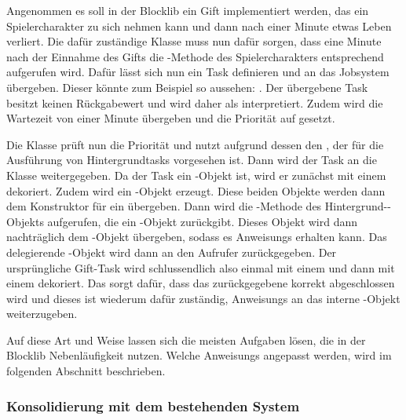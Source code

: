 \begin{example}
	Angenommen es soll in der Blocklib ein Gift implementiert werden, das ein Spielercharakter zu sich nehmen kann und dann nach einer Minute etwas Leben verliert. Die dafür zuständige Klasse muss nun dafür sorgen, dass eine Minute nach der Einnahme des Gifts die -Methode des Spielercharakters entsprechend aufgerufen wird. Dafür lässt sich nun ein Task definieren und an das Jobsystem übergeben. Dieser könnte zum Beispiel so aussehen: . Der übergebene Task besitzt keinen Rückgabewert und wird daher als \classRunnable{} interpretiert. Zudem wird die Wartezeit von einer Minute übergeben und die Priorität auf  gesetzt.

	Die Klasse \classBlocklibExecutor{} prüft nun die Priorität und nutzt aufgrund dessen den \classExecutorService{}, der für die Ausführung von Hintergrundtasks vorgesehen ist. Dann wird der Task an die Klasse \classCompletableFutureWrapper{} weitergegeben. Da der Task ein \classRunnable{}-Objekt ist, wird er zunächst mit einem \classRunnableCallable{} dekoriert. Zudem wird ein \classDelegatingScheduledCompletableFuture{}-Objekt erzeugt. Diese beiden Objekte werden dann dem Konstruktor für ein \classCompletingCallable{} übergeben. Dann wird die -Methode des Hintergrund-\classScheduledThreadPoolExecutor{}-Objekts aufgerufen, die ein \classFuture{}-Objekt zurückgibt. Dieses Objekt wird dann nachträglich dem \classDelegatingScheduledCompletableFuture{}-Objekt übergeben, sodass es \glspl{Anweisung} erhalten kann. Das delegierende \classCompletableFuture{}-Objekt wird dann an den Aufrufer zurückgegeben. Der ursprüngliche Gift-Task wird schlussendlich also einmal mit einem \classRunnableCallable{} und dann mit einem \classCompletingCallable{} dekoriert. Das \classCompletingCallable{} sorgt dafür, dass das zurückgegebene \classCompletableFuture{} korrekt abgeschlossen wird und dieses ist wiederum dafür zuständig, \glspl{Anweisung} an das interne \classFuture{}-Objekt weiterzugeben.
\end{example}

Auf diese Art und Weise lassen sich die meisten Aufgaben lösen, die in der Blocklib Nebenläufigkeit nutzen. Welche \glspl{Anweisung} angepasst werden, wird im folgenden Abschnitt beschrieben.

\subsubsection{Konsolidierung mit dem bestehenden System}\label{sec:Konsolidierung}

